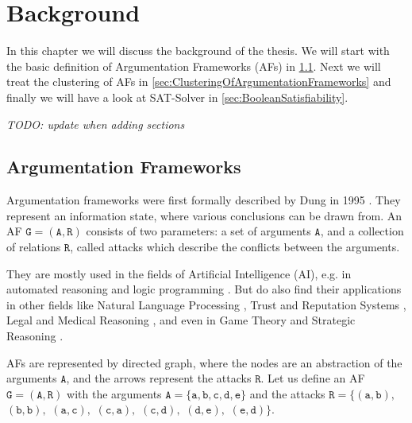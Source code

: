 \chapter{Background}
In this chapter we will discuss the background of the thesis. We will start with the basic definition of Argumentation Frameworks (AFs) in \cref{sec:ArgumentationFrameworks}. Next we will treat the clustering of AFs in \cref{sec:ClusteringOfArgumentationFrameworks} and finally we will have a look at SAT-Solver in \cref{sec:BooleanSatisfiability}.

\textit{TODO: update when adding sections}


\section{Argumentation Frameworks}
\label{sec:ArgumentationFrameworks}

Argumentation frameworks were first formally described by Dung in 1995 \cite{DUNG1995321}. They represent an information state, where various conclusions can be drawn from. An AF $\mathtt{G = (A, R)}$ consists of two parameters: a set of arguments $\mathtt{A}$, and a collection of relations $\mathtt{R}$, called attacks which describe the conflicts between the arguments.

They are mostly used in the fields of Artificial Intelligence (AI), e.g. in automated reasoning and logic programming \cite{AFINAIARLP, AFINAIARLPexample}. But do also find their applications in other fields like Natural Language Processing \cite{AFINNLP}, Trust and Reputation Systems \cite{AFINTaRS}, Legal and Medical Reasoning \cite{legalAndMedicalReasoning}, and even in Game Theory and Strategic Reasoning \cite{AFinGames}.

AFs are represented by directed graph, where the nodes are an abstraction of the arguments $\mathtt{A}$, and the arrows represent the attacks $\mathtt{R}$. Let us define an AF $\mathtt{G = (A, R)}$ with the arguments
$\mathtt{A=\{a, b, c, d, e\}}$ and the attacks
$\mathtt{R=\{(a,b),}$
$\mathtt{(b,b),}$
$\mathtt{(a,c),}$
$\mathtt{(c,a),}$
$\mathtt{(c,d),}$
$\mathtt{(d,e),}$
$\mathtt{(e,d)\}}.$

